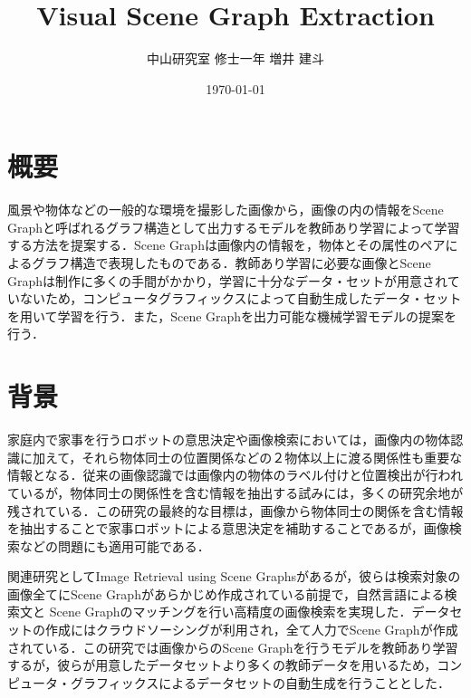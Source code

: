 

\title{Visual Scene Graph Extraction}
\author{中山研究室 修士一年 増井 建斗}
\date{\today}

\maketitle


\section{概要}
風景や物体などの一般的な環境を撮影した画像から，画像の内の情報をScene Graph\cite{scene_graph}と呼ばれるグラフ構造として出力するモデルを教師あり学習によって学習する方法を提案する．Scene Graphは画像内の情報を，物体とその属性のペアによるグラフ構造で表現したものである．教師あり学習に必要な画像とScene Graphは制作に多くの手間がかかり，学習に十分なデータ・セットが用意されていないため，コンピュータグラフィックスによって自動生成したデータ・セットを用いて学習を行う．また，Scene Graphを出力可能な機械学習モデルの提案を行う．

\section{背景}
家庭内で家事を行うロボットの意思決定や画像検索においては，画像内の物体認識に加えて，それら物体同士の位置関係などの２物体以上に渡る関係性も重要な情報となる．従来の画像認識では画像内の物体のラベル付けと位置検出が行われているが，物体同士の関係性を含む情報を抽出する試みには，多くの研究余地が残されている．この研究の最終的な目標は，画像から物体同士の関係を含む情報を抽出することで家事ロボットによる意思決定を補助することであるが，画像検索などの問題にも適用可能である．

関連研究としてImage Retrieval using Scene Graphs\cite{scene_graph}があるが，彼らは検索対象の画像全てにScene Graphがあらかじめ作成されている前提で，自然言語による検索文と
Scene Graphのマッチングを行い高精度の画像検索を実現した．データセットの作成にはクラウドソーシングが利用され，全て人力でScene Graphが作成されている．この研究では画像からのScene Graphを行うモデルを教師あり学習するが，彼らが用意したデータセットより多くの教師データを用いるため，コンピュータ・グラフィックスによるデータセットの自動生成を行うこととした．

